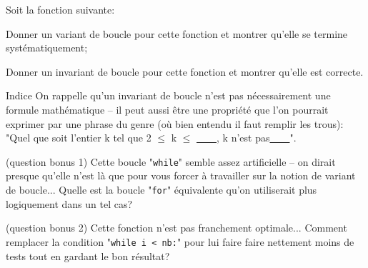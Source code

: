 \documentclass[12pt]{article}
\begin{document}
	\begin{MonExo}
		Soit la fonction suivante:
		\begin{alphenum}
			\item Donner un variant de boucle pour cette fonction et montrer qu'elle se termine systématiquement;
			\item Donner un invariant de boucle pour cette fonction et montrer qu'elle est correcte.
			\begin{MonAmp}{Indice}
				On rappelle qu'un invariant de boucle n'est pas nécessairement une formule mathématique -- il peut aussi être une propriété que l'on pourrait exprimer par une phrase du genre (où bien entendu il faut remplir les trous): "Quel que soit l'entier k tel que 2 $\leq$ k $\leq$ \uline{\ \ \ \ }, k n'est pas\uline{\ \ \ \ }".
			\end{MonAmp}
			\item (question bonus 1) Cette boucle "\texttt{while}" semble assez artificielle -- on dirait presque qu'elle n'est là que pour vous forcer à travailler sur la notion de variant de boucle... Quelle est la boucle "\texttt{for}" équivalente qu'on utiliserait plus logiquement dans un tel cas?
			\item (question bonus 2) Cette fonction n'est pas franchement optimale... Comment remplacer la condition "\texttt{while i < nb:}" pour lui faire faire nettement moins de tests tout en gardant le bon résultat?
		\end{alphenum}
	\end{MonExo}
	
\end{document}
